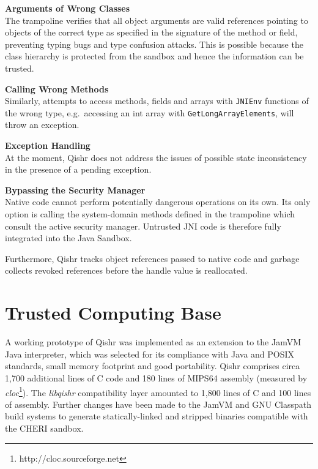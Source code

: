 \documentclass[a4paper,12pt,twoside,openright]{report}
\newcommand{\keyword}[1]{\textsf{#1}}
\newcommand{\tool}[1]{\emph{#1}}
\newcommand{\lib}[1]{\tool{lib#1}}
\begin{document}
\begin{description}
\item{\bf Arguments of Wrong Classes} \\
The trampoline verifies that all object arguments are valid references pointing to objects of the correct type as specified in the signature of the method or field, preventing typing bugs and type confusion attacks. This is possible because the class hierarchy is protected from the sandbox and hence the information can be trusted.

\item{\bf Calling Wrong Methods} \\
Similarly, attempts to access methods, fields and arrays with \texttt{JNIEnv} functions of the wrong type, e.g.\ accessing an \keyword{int} array with \texttt{Get\-Long\-Array\-Elements}, will throw an exception.

\item{\bf Exception Handling} \\
At the moment, Qishr does not address the issues of possible state inconsistency in the presence of a pending exception.

\item{\bf Bypassing the Security Manager} \\
Native code cannot perform potentially dangerous operations on its own. Its only option is calling the system-domain methods defined in the trampoline which consult the active security manager. Untrusted JNI code is therefore fully integrated into the Java Sandbox.
\end{description}

Furthermore, Qishr tracks object references passed to native code and garbage collects revoked references before the handle value is reallocated.

\section{Trusted Computing Base}

A working prototype of Qishr was implemented as an extension to the JamVM Java interpreter, which was selected for its compliance with Java and POSIX standards, small memory footprint and good portability. Qishr comprises circa 1,700 additional lines of C code and 180 lines of MIPS64 assembly (measured by \emph{cloc}\footnote{http://cloc.sourceforge.net}). The \lib{qishr} compatibility layer amounted to 1,800 lines of C and 100 lines of assembly. Further changes have been made to the JamVM and GNU Classpath build systems to generate statically-linked and stripped binaries compatible with the CHERI sandbox.
\end{document}
